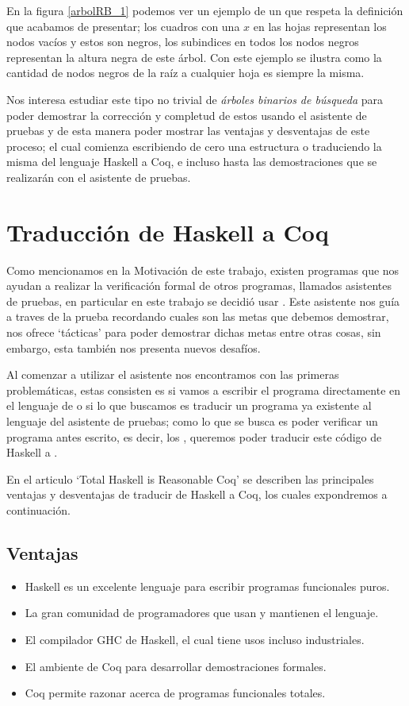 En la figura \ref{arbolRB_1} podemos ver un ejemplo de un {\arn} que respeta la definici\'on que
acabamos de presentar; los cuadros con una $x$ en las hojas representan los nodos vacíos y estos
son negros, los subindices en todos los nodos negros representan la altura negra de este \'arbol.
Con este ejemplo se ilustra como la cantidad de nodos negros de la ra\'iz a cualquier hoja es
siempre la misma.

Nos interesa estudiar este tipo no trivial de \textit{\'arboles binarios de búsqueda} para poder
demostrar la correcci\'on y completud de estos usando el asistente de pruebas {\coq} y de esta
manera poder mostrar las ventajas y desventajas de este proceso; el cual comienza escribiendo de
cero una estructura o traduciendo la misma del lenguaje Haskell a Coq, e incluso hasta las
demostraciones que se realizar\'an con el asistente de pruebas.

\section{Traducción de Haskell a Coq}
Como mencionamos en la Motivación de este trabajo, existen programas que nos ayudan a realizar la
verificaci\'on formal de otros programas, llamados asistentes de pruebas, en particular en este
trabajo se decidió usar {\coq}. Este asistente nos gu\'ia a traves de la prueba recordando cuales
son las metas que debemos demostrar, nos ofrece `t\'acticas' para poder demostrar dichas metas
entre otras cosas, sin embargo, esta tambi\'en nos presenta nuevos desaf\'ios.

Al comenzar a utilizar el asistente nos encontramos con las primeras problem\'aticas, estas
consisten es si vamos a escribir el programa directamente en el lenguaje de {\coq} o si lo que
buscamos es traducir un programa ya existente al lenguaje del asistente de pruebas; como lo que se
busca es poder verificar un programa antes escrito, es decir, los {\arns}, queremos poder traducir
este código de Haskell a {\coq}.

En el articulo `Total Haskell is Reasonable Coq' \cite{thrc} se describen las principales ventajas
y desventajas de traducir de Haskell a Coq, los cuales expondremos a continuaci\'on.

\subsection{Ventajas}
\begin{itemize}
    \item Haskell es un excelente lenguaje para escribir programas funcionales puros.
    \item La gran comunidad de programadores que usan y mantienen el lenguaje.
    \item El compilador GHC de Haskell, el cual tiene usos incluso industriales.
    \item El ambiente de Coq para desarrollar demostraciones formales.
    \item Coq permite razonar acerca de programas funcionales totales.
\end{itemize}

